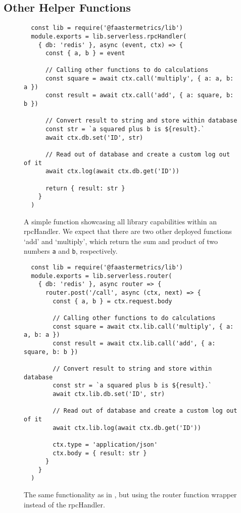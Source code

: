 \documentclass[../main.tex]{subfiles}
\begin{document}
\subsection{Other Helper Functions}\label{sub:helperFunctions}

\begin{figure}
\begin{tcolorbox}
\begin{verbatim}
  const lib = require('@faastermetrics/lib')
  module.exports = lib.serverless.rpcHandler(
    { db: 'redis' }, async (event, ctx) => {
      const { a, b } = event
  
      // Calling other functions to do calculations
      const square = await ctx.call('multiply', { a: a, b: a })
      const result = await ctx.call('add', { a: square, b: b })
  
      // Convert result to string and store within database
      const str = `a squared plus b is ${result}.`
      await ctx.db.set('ID', str)

      // Read out of database and create a custom log out of it
      await ctx.log(await ctx.db.get('ID'))

      return { result: str }
    }
  )
\end{verbatim}
\end{tcolorbox}
\caption{%
  A simple function showcasing all library capabilities within an rpcHandler.
  We expect that there are two other deployed functions `add' and `multiply',
  which return the sum and product of two numbers \texttt{a} and \texttt{b}, respectively.
}%
\label{fig:rpcHandlerFullFunctionalityExample}
\end{figure}

\begin{figure}
\begin{tcolorbox}
\begin{verbatim}
  const lib = require('@faastermetrics/lib')
  module.exports = lib.serverless.router(
    { db: 'redis' }, async router => {
      router.post('/call', async (ctx, next) => {
        const { a, b } = ctx.request.body
    
        // Calling other functions to do calculations
        const square = await ctx.lib.call('multiply', { a: a, b: a })
        const result = await ctx.lib.call('add', { a: square, b: b })
   
        // Convert result to string and store within database
        const str = `a squared plus b is ${result}.`
        await ctx.lib.db.set('ID', str)
  
        // Read out of database and create a custom log out of it
        await ctx.lib.log(await ctx.db.get('ID'))
  
        ctx.type = 'application/json'
        ctx.body = { result: str }
      }
    }
  )
\end{verbatim}
\end{tcolorbox}
\caption{%
  The same functionality as in , 
  but using the router function wrapper instead of the rpcHandler.
}%
\label{fig:routerFullFunctionalityExample}
\end{figure}
\end{document}
